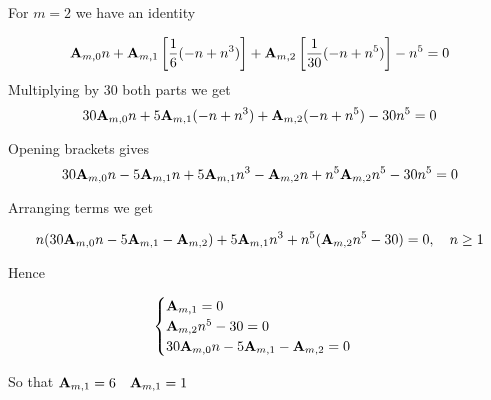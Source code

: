 For $m=2$ we have an identity

\begin{equation*}
    {\mathbf{A}} \sb{m,0} n
    + {\mathbf{A}} \sb{m,1} \left[ \frac{1}{6} (-n + n^3) \right]
    + {\mathbf{A}} \sb{m,2} \left[ \frac{1}{30} (-n + n^5) \right] - n^5 = 0
\end{equation*}
Multiplying by 30 both parts we get
\begin{equation*}
    30 {\mathbf{A}} \sb{m,0} n
    + 5 {\mathbf{A}} \sb{m,1}  (-n + n^3)
    + {\mathbf{A}} \sb{m,2} (-n + n^5) - 30 n^5 = 0
\end{equation*}

Opening brackets gives
\begin{equation*}
    30 {\mathbf{A}} \sb{m,0} n -5 {\mathbf{A}} \sb{m,1} n + 5 {\mathbf{A}} \sb{m,1} n^3 -{\mathbf{A}} \sb{m,2} n + n^5 {\mathbf{A}} \sb{m,2} n^5 - 30 n^5 = 0
\end{equation*}

Arranging terms we get

\begin{equation*}
    n (30 {\mathbf{A}} \sb{m,0} n - 5 {\mathbf{A}} \sb{m,1} -{\mathbf{A}} \sb{m,2}) + 5 {\mathbf{A}} \sb{m,1} n^3 + n^5 ({\mathbf{A}} \sb{m,2} n^5 - 30) = 0, \quad n \geq 1
\end{equation*}

Hence

\begin{equation*}
    \begin{cases}
        {\mathbf{A}} \sb{m,1} = 0 \\
        {\mathbf{A}} \sb{m,2} n^5 - 30 = 0 \\
        30 {\mathbf{A}} \sb{m,0} n - 5 {\mathbf{A}} \sb{m,1} -{\mathbf{A}} \sb{m,2} = 0
    \end{cases}
\end{equation*}

So that ${\mathbf{A}} \sb{m,1}=6 \quad {\mathbf{A}} \sb{m,1} = 1$